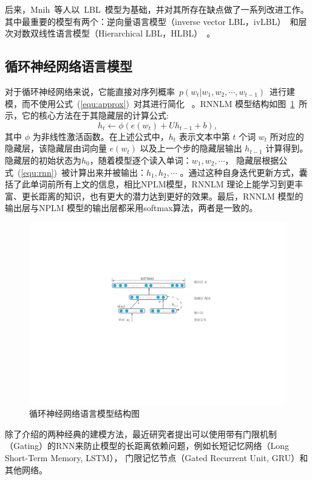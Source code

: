 后来，Mnih~等人以~LBL~模型为基础，并对其所存在缺点做了一系列改进工作。其中最重要的模型有两个：逆向量语言模型（inverse vector LBL，ivLBL）~和层次对数双线性语言模型（Hierarchical LBL，HLBL）~。

\subsection{循环神经网络语言模型}
对于循环神经网络来说，它能直接对序列概率~$p(w_t | w_1,w_2,\cdots,w_{t-1})$~进行建模，而不使用公式~(\ref{equ:approx})~对其进行简化~ 。RNNLM 模型结构如图~\ref{fig:rnnlm}~所示，它的核心方法在于其隐藏层的计算公式:
\begin{equation}
\label{equ:rnn}
  h_t \leftarrow  \phi(e(w_t) + U h_{t-1} +b),
\end{equation}
其中 $\phi$ 为非线性激活函数。在上述公式中，$h_t$ 表示文本中第 $t$ 个词 $w_t$ 所对应的隐藏层，该隐藏层由词向量 $e(w_t)$ 以及上一个步的隐藏层输出 $h_{t -1}$ 计算得到。隐藏层的初始状态为$h_0$，随着模型逐个读入单词：$w_1,w_2,\cdots$， 隐藏层根据公式~(\ref{equ:rnn})~被计算出来并被输出：$h_1,h_2,\cdots$ 。通过这种自身迭代更新方式，囊括了此单词前所有上文的信息，相比NPLM模型，RNNLM 理论上能学习到更丰富、更长距离的知识，也有更大的潜力达到更好的效果。最后，RNNLM 模型的输出层与NPLM 模型的输出层都采用softmax算法，两者是一致的。

\begin{figure}
  \centering
  \includegraphics[width=.8\linewidth]{./figures/rnnlm.pdf}
  \caption{循环神经网络语言模型结构图}\label{fig:rnnlm}
\end{figure}


除了介绍的两种经典的建模方法，最近研究者提出可以使用带有门限机制（Gating）的RNN来防止模型的长距离依赖问题，例如长短记忆网络（Long Short-Term Memory, LSTM）， 门限记忆节点（Gated Recurrent Unit, GRU）和其他网络。


